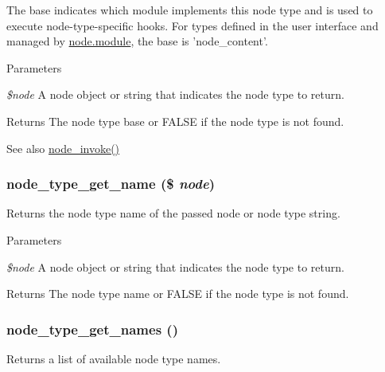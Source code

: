 The base indicates which module implements this node type and is used to execute node-\/type-\/specific hooks. For types defined in the user interface and managed by \hyperlink{node_8module}{node.module}, the base is 'node\_\-content'.


\begin{DoxyParams}{Parameters}
\item[{\em \$node}]A node object or string that indicates the node type to return.\end{DoxyParams}
\begin{DoxyReturn}{Returns}
The node type base or FALSE if the node type is not found.
\end{DoxyReturn}
\begin{DoxySeeAlso}{See also}
\hyperlink{node_8module_a1902c3061c34578c266d8171644b18f0}{node\_\-invoke()} 
\end{DoxySeeAlso}
\hypertarget{node_8module_acca428605d649d2a4b025bb8b32e24fd}{
\subsubsection[{node\_\-type\_\-get\_\-name}]{\setlength{\rightskip}{0pt plus 5cm}node\_\-type\_\-get\_\-name (\$ {\em node})}}
\label{node_8module_acca428605d649d2a4b025bb8b32e24fd}
Returns the node type name of the passed node or node type string.


\begin{DoxyParams}{Parameters}
\item[{\em \$node}]A node object or string that indicates the node type to return.\end{DoxyParams}
\begin{DoxyReturn}{Returns}
The node type name or FALSE if the node type is not found. 
\end{DoxyReturn}
\hypertarget{node_8module_aa34a830a516a8fb62280a6e5df20acd8}{
\subsubsection[{node\_\-type\_\-get\_\-names}]{\setlength{\rightskip}{0pt plus 5cm}node\_\-type\_\-get\_\-names ()}}
\label{node_8module_aa34a830a516a8fb62280a6e5df20acd8}
Returns a list of available node type names.


